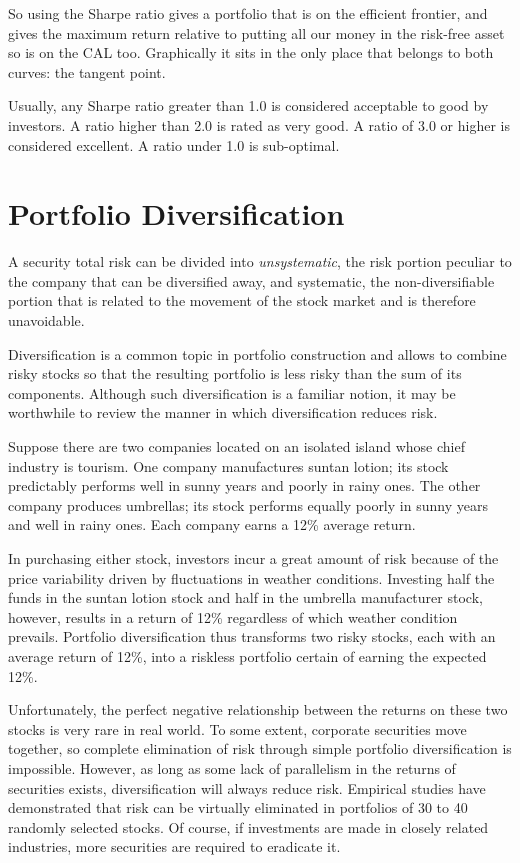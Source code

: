 So using the Sharpe ratio gives a portfolio that is on the efficient frontier, and gives the maximum return relative to putting all our money in the risk-free asset so is on the CAL too. Graphically it sits in the only place that belongs to both curves: the tangent point.

Usually, any Sharpe ratio greater than 1.0 is considered acceptable to good by investors. A ratio higher than 2.0 is rated as very good. A ratio of 3.0 or higher is considered excellent. A ratio under 1.0 is sub-optimal.

\section{Portfolio Diversification}

A security total risk can be divided into \emph{unsystematic}, the risk portion peculiar to the company that can be diversified away, and systematic, the non-diversifiable portion that is related to the movement of the stock market and is therefore unavoidable. 

Diversification is a common topic in portfolio construction and allows to combine risky stocks so that the resulting portfolio is less risky than the sum of its components. Although such diversification is a familiar notion, it may be worthwhile to review the manner in which diversification reduces risk.

Suppose there are two companies located on an isolated island whose chief industry is tourism. One company manufactures suntan lotion; its stock predictably performs well in sunny years and poorly in rainy ones. The other company produces umbrellas; its stock performs equally poorly in sunny years and well in rainy ones. Each company earns a 12\% average return.

In purchasing either stock, investors incur a great amount of risk because of the price variability driven by fluctuations in weather conditions. Investing half the funds in the suntan lotion stock and half in the umbrella manufacturer stock, however, results in a return of 12\% regardless of which weather condition prevails. Portfolio diversification thus transforms two risky stocks, each with an average return of 12\%, into a riskless portfolio certain of earning the expected 12\%.

Unfortunately, the perfect negative relationship between the returns on these two stocks is very rare in real world. To some extent, corporate securities move together, so complete elimination of risk through simple portfolio diversification is impossible. However, as long as some lack of parallelism in the returns of securities exists, diversification will always reduce risk.
Empirical studies have demonstrated that risk can be virtually eliminated in portfolios of 30 to 40 randomly selected stocks. Of course, if investments are made in closely related industries, more securities are required to eradicate it.

